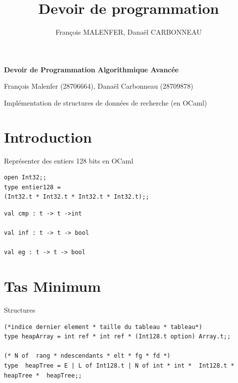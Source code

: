\documentclass[11pt]{beamer}
\author{François MALENFER, Danaël CARBONNEAU}
\title{Devoir de programmation}
\begin{document}
\begin{frame}


\center 
\bigskip


{ \huge \bfseries \color{teal} Devoir de Programmation }
\textbf{Algorithmique Avancée}

{\color{darkgray} François Malenfer (28706664), Danaël Carbonneau (28709878)}

\medskip

\begin{large}

{\selectfont
Implémentation de structures de données de recherche (en OCaml)\cite{leroy3ocaml}
}
\end{large}

\end{frame}


 \section{Introduction}


\begin{frame}[fragile]{Représenter des entiers 128 bits en OCaml}


\begin{lstlisting}
open Int32;;
type entier128 = 
(Int32.t * Int32.t * Int32.t * Int32.t);;
\end{lstlisting} 

\begin{lstlisting}
val cmp : t -> t ->int

val inf : t -> t -> bool

val eg : t -> t -> bool
\end{lstlisting} 


\end{frame}

\section{Tas Minimum}

\begin{frame}[fragile]{Structures\cite{DataStructure}}


\bigskip \begin{lstlisting}
(*indice dernier element * taille du tableau * tableau*)
type heapArray = int ref * int ref * (Int128.t option) Array.t;;

(* N of  rang * ndescendants * elt * fg * fd *)
type  heapTree = E | L of Int128.t | N of int * int *  Int128.t *  heapTree *  heapTree;;
\end{lstlisting} \bigskip


\end{frame}
\end{document}
